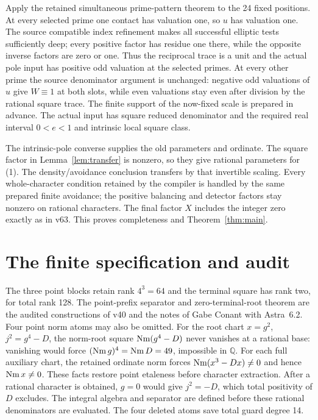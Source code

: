 \documentclass[11pt]{article}
\newcommand{\Q}{\mathbb Q}\newcommand{\Z}{\mathbb Z}
\begin{document}
Apply the retained simultaneous prime-pattern theorem to the 24
fixed positions. At every selected prime one contact has valuation
one, so $u$ has valuation one. The source compatible index refinement
makes all successful elliptic tests sufficiently deep; every positive
factor has residue one there, while the opposite inverse factors
are zero or one. Thus the reciprocal trace is a unit and the actual
pole input has positive odd valuation at the selected primes.
At every other prime the source denominator argument is unchanged:
negative odd valuations of $u$ give $W\equiv1$ at both slots, while
even valuations stay even after division by the rational square trace.
The finite support of the now-fixed scale is prepared in advance.
The actual input has square reduced denominator and the required
real interval $0<e<1$ and intrinsic local square class.

The intrinsic-pole converse supplies the old parameters and ordinate.
The square factor in Lemma~\ref{lem:transfer} is nonzero, so they give
rational parameters for (1). The density/avoidance conclusion transfers
by that invertible scaling. Every whole-character condition retained
by the compiler is handled by the same prepared finite avoidance;
the positive balancing and detector factors stay nonzero on rational
characters. The final factor $X$ includes the integer zero exactly
as in v63. This proves completeness and Theorem~\ref{thm:main}.

\section{The finite specification and audit}

The three point blocks retain rank $4^3=64$ and the terminal square
has rank two, for total rank 128. The point-prefix separator and
zero-terminal-root theorem are the audited constructions of v40 and
the notes of Gabe Conant with Astra~6.2. Four point norm atoms may also be omitted.
For the root chart $x=g^2$, $j^2=g^4-D$, the norm-root square
$\operatorname{Nm}(g^4-D)$ never vanishes at a rational base: vanishing would force
$(\operatorname{Nm} g)^4=\operatorname{Nm} D=49$, impossible in $\Q$.
For each full auxiliary chart, the retained ordinate norm forces
$\operatorname{Nm}(x^3-Dx)\ne0$ and hence $\operatorname{Nm} x\ne0$.
These facts restore point etaleness before character extraction.
After a rational character is obtained, $g=0$ would give $j^2=-D$,
which total positivity of $D$ excludes. The integral algebra and
separator are defined before these rational denominators are evaluated.
The four deleted atoms save total guard degree 14.
\end{document}
